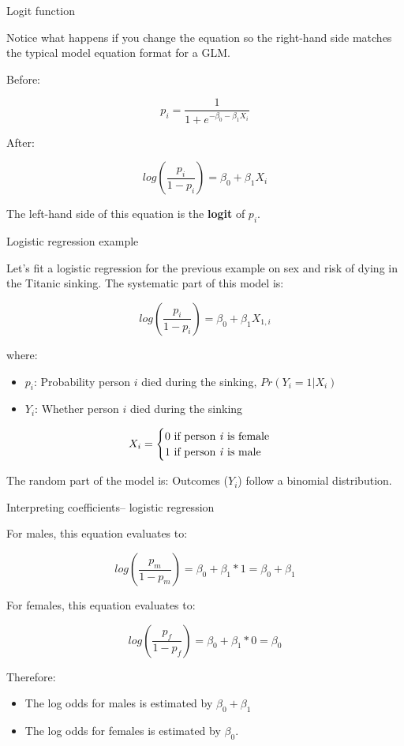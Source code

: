 \documentclass[ignorenonframetext,]{beamer}
\providecommand{\tightlist}{%
  \setlength{\itemsep}{0pt}\setlength{\parskip}{0pt}}
\begin{document}
\begin{frame}{Logit function}

Notice what happens if you change the equation so the right-hand side
matches the typical model equation format for a GLM. \medskip

Before:

\[
p_i = \frac{1}{1 + e^{-\beta_0 - \beta_1X_i}}
\]

After:

\[
log(\frac{p_i}{1 - p_i}) = \beta_0 + \beta_1X_i
\]

\medskip The left-hand side of this equation is the \textbf{logit} of
\(p_i\).

\end{frame}

\begin{frame}{Logistic regression example}

Let's fit a logistic regression for the previous example on sex and risk
of dying in the Titanic sinking. The systematic part of this model is:

\[
log(\frac{p_i}{1 - p_i}) = \beta_0 + \beta_1X_{1,i}
\]

where:

\begin{itemize}
\tightlist
\item
  \(p_i\): Probability person \(i\) died during the sinking,
  \(Pr(Y_i = 1 | X_i)\)
\item
  \(Y_i\): Whether person \(i\) died during the sinking
\end{itemize}

\begin{equation*}
    X_i=
    \begin{cases}
      0 \text{ if person \textit{i} is female} \\
      1 \text{ if person \textit{i} is male}
    \end{cases}
\end{equation*}

The random part of the model is: Outcomes (\(Y_i\)) follow a binomial
distribution.

\end{frame}

\begin{frame}{Interpreting coefficients-- logistic regression}

For males, this equation evaluates to:

\[
log(\frac{p_m}{1 - p_m}) = \beta_0 + \beta_1*1 = \beta_0 + \beta_1
\]

For females, this equation evaluates to:

\[
log(\frac{p_f}{1 - p_f}) = \beta_0 + \beta_1*0 = \beta_0 
\]

Therefore:

\begin{itemize}
\tightlist
\item
  The log odds for males is estimated by \(\beta_0 + \beta_1\)
\item
  The log odds for females is estimated by \(\beta_0\).
\end{itemize}

\end{frame}
\end{document}
